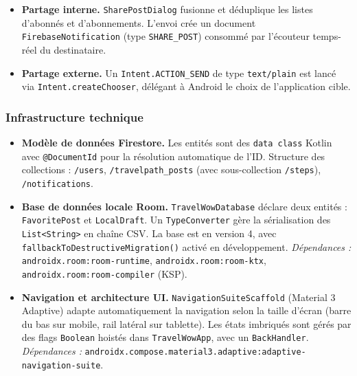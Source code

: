 \documentclass[a4paper, 12pt]{article}
\begin{document}
\begin{justify}
\begin{itemize}
    \item \textbf{Partage interne.}
    \texttt{SharePostDialog} fusionne et déduplique les listes d'abonnés et d'abonnements. L'envoi crée un document \texttt{FirebaseNotification} (type \texttt{SHARE\_POST}) consommé par l'écouteur temps-réel du destinataire.

    \item \textbf{Partage externe.}
    Un \texttt{Intent.\allowbreak{}ACTION\_SEND} de type \texttt{text/\allowbreak{}plain} est lancé via \texttt{Intent.\allowbreak{}createChooser}, délégant à Android le choix de l'application cible.

\end{itemize}

\subsubsection*{Infrastructure technique}

\begin{itemize}

    \item \textbf{Modèle de données Firestore.}
    Les entités sont des \texttt{data class} Kotlin avec \texttt{@DocumentId} pour la résolution automatique de l'ID. Structure des collections : \texttt{/\allowbreak{}users}, \texttt{/\allowbreak{}travelpath\_posts} (avec sous-collection \texttt{/\allowbreak{}steps}), \texttt{/\allowbreak{}notifications}.

    \item \textbf{Base de données locale Room.}
    \texttt{TravelWowDatabase} déclare deux entités : \texttt{FavoritePost} et \texttt{LocalDraft}. Un \texttt{TypeConverter} gère la sérialisation des \texttt{List<String>} en chaîne CSV. La base est en version 4, avec \texttt{fallbackToDestructiveMigration()} activé en développement.
    \newline\textit{Dépendances :} \texttt{androidx.\allowbreak{}room:\allowbreak{}room-runtime}, \texttt{androidx.\allowbreak{}room:\allowbreak{}room-ktx}, \texttt{androidx.\allowbreak{}room:\allowbreak{}room-compiler} (KSP).

    \item \textbf{Navigation et architecture UI.}
    \texttt{NavigationSuiteScaffold} (Material 3 Adaptive) adapte automatiquement la navigation selon la taille d'écran (barre du bas sur mobile, rail latéral sur tablette). Les états imbriqués sont gérés par des flags \texttt{Boolean} hoistés dans \texttt{TravelWowApp}, avec un \texttt{BackHandler}.
    \newline\textit{Dépendances :} \texttt{androidx.\allowbreak{}compose.\allowbreak{}material3.\allowbreak{}adaptive:\allowbreak{}adaptive-navigation-suite}.


\end{itemize}
\end{justify}
\end{document}
